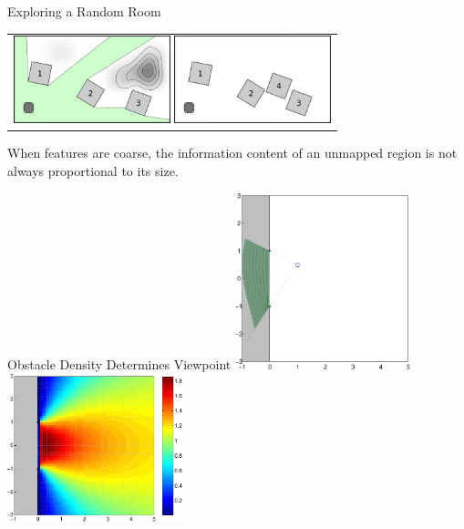 \begin{tframe}{Exploring a Random Room}
\begin{center}
\begin{tabular}{c}
\includegraphics[height=1in]{media_exploration/random_block_marg}
\includegraphics[height=1in]{media_exploration/random_block}
\end{tabular}
\end{center}
\begin{block}{}
 When features are coarse,
 the information content of an unmapped region is not
 always proportional to its size.  
\end{block}
\end{tframe}

\addtocounter{framenumber}{-1}
\begin{tframe}{Obstacle Density Determines Viewpoint}
\includegraphics[width=2in]{media_exploration/penetration1}
\includegraphics[width=2in]{media_exploration/JEnergy1}
\end{tframe}


